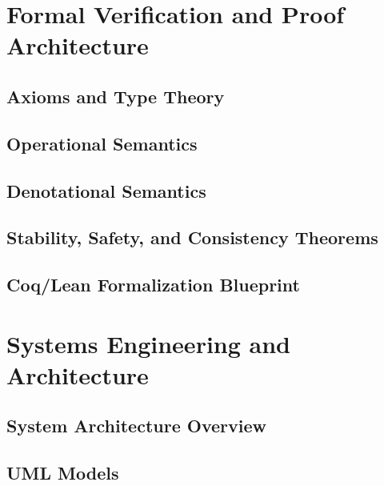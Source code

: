 \documentclass[11pt,oneside]{book}
\begin{document}

\part{Formal Verification and Proof Architecture}

\chapter{Axioms and Type Theory}


\chapter{Operational Semantics}


\chapter{Denotational Semantics}


\chapter{Stability, Safety, and Consistency Theorems}


\chapter{Coq/Lean Formalization Blueprint}



\part{Systems Engineering and Architecture}

\chapter{System Architecture Overview}


\chapter{UML Models}

\end{document}
